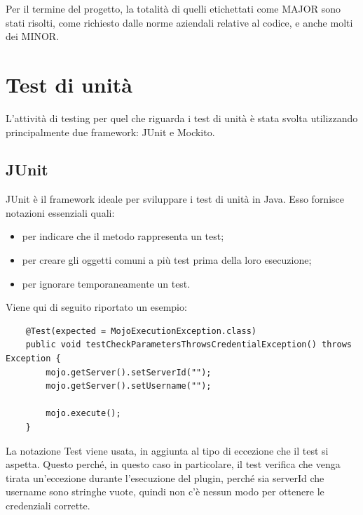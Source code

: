 Per il termine del progetto, la totalità di quelli etichettati come MAJOR sono stati risolti, come richiesto dalle norme aziendali relative al codice, e anche molti dei MINOR.
 

\section{Test di unità}

L'attività di testing per quel che riguarda i test di unità è stata svolta utilizzando principalmente due framework: JUnit e Mockito.

    \subsection{JUnit}
    JUnit è il framework ideale per sviluppare i test di unità in Java.
    Esso fornisce notazioni essenziali quali:
    \begin{itemize}
        \item {} per indicare che il metodo rappresenta un test;
        \item {} per creare gli oggetti comuni a più test prima della loro esecuzione;
        \item {} per ignorare temporaneamente un test.
    \end{itemize}
    
    Viene qui di seguito riportato un esempio:
    \begin{lstlisting} 
    @Test(expected = MojoExecutionException.class)
    public void testCheckParametersThrowsCredentialException() throws Exception {
        mojo.getServer().setServerId("");
        mojo.getServer().setUsername("");

        mojo.execute();
    }
    \end{lstlisting}
    La notazione Test viene usata, in aggiunta al tipo di eccezione che il test si aspetta.
    Questo perché, in questo caso in particolare, il test verifica che venga tirata un'eccezione durante l'esecuzione del plugin, perché sia serverId che username sono stringhe vuote, quindi non c'è nessun modo per ottenere le credenziali corrette. \\

